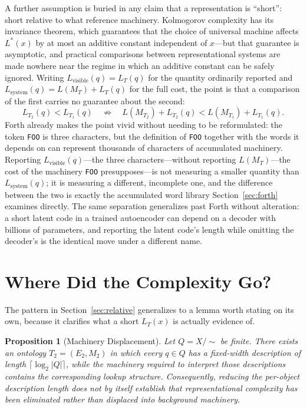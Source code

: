 \documentclass[11pt]{article}
\theoremstyle{plain}
\newtheorem{proposition}{Proposition}
\begin{document}
A further assumption is buried in any claim that a representation is ``short'': short relative to what reference machinery. Kolmogorov complexity has its invariance theorem, which guarantees that the choice of universal machine affects $L^*(x)$ by at most an additive constant independent of $x$---but that guarantee is asymptotic, and practical comparisons between representational systems are made nowhere near the regime in which an additive constant can be safely ignored. Writing $L_{\mathrm{visible}}(q) = L_T(q)$ for the quantity ordinarily reported and $L_{\mathrm{system}}(q) = L(M_T) + L_T(q)$ for the full cost, the point is that a comparison of the first carries no guarantee about the second:
\[
L_{T_2}(q) < L_{T_1}(q) \quad \not\Rightarrow \quad L(M_{T_2}) + L_{T_2}(q) < L(M_{T_1}) + L_{T_1}(q).
\]
Forth already makes the point vivid without needing to be reformulated: the token \texttt{FOO} is three characters, but the definition of \texttt{FOO} together with the words it depends on can represent thousands of characters of accumulated machinery. Reporting $L_{\mathrm{visible}}(q)$---the three characters---without reporting $L(M_T)$---the cost of the machinery \texttt{FOO} presupposes---is not measuring a smaller quantity than $L_{\mathrm{system}}(q)$; it is measuring a different, incomplete one, and the difference between the two is exactly the accumulated word library Section~\ref{sec:forth} examines directly. The same separation generalizes past Forth without alteration: a short latent code in a trained autoencoder can depend on a decoder with billions of parameters, and reporting the latent code's length while omitting the decoder's is the identical move under a different name.

\section{Where Did the Complexity Go?}
\label{sec:relocation}

The pattern in Section~\ref{sec:relative} generalizes to a lemma worth stating on its own, because it clarifies what a short $L_T(x)$ is actually evidence of.

\begin{proposition}[Machinery Displacement]
Let $Q = X/\!\sim$ be finite. There exists an ontology $T_2 = (E_2, M_2)$ in which every $q \in Q$ has a fixed-width description of length $\lceil \log_2 |Q| \rceil$, while the machinery required to interpret those descriptions contains the corresponding lookup structure. Consequently, reducing the per-object description length does not by itself establish that representational complexity has been eliminated rather than displaced into background machinery.
\end{proposition}
\end{document}
